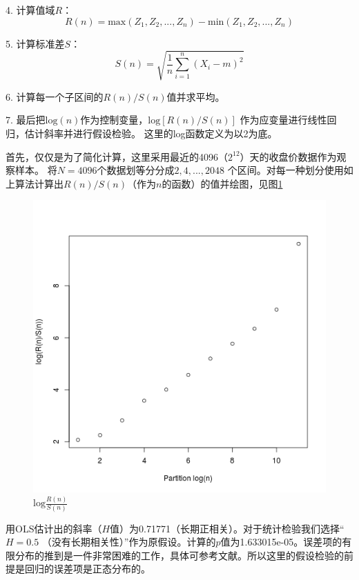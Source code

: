 \documentclass[11pt]{article}
\begin{document}
4. 计算值域$R$：
\begin{equation}
R(n) = \text{max}(Z_1,Z_2,...,Z_n)-\text{min}(Z_1,Z_2,...,Z_n)
\end{equation}

5. 计算标准差$S$：
\begin{equation}
S(n)=\sqrt{\frac{1}{n}\sum\limits_{i=1}^n(X_i-m)^2}
\end{equation}

6. 计算每一个子区间的$R(n)/S(n)$值并求平均。

7. 最后把$\text{log}(n)$作为控制变量，$\text{log}[ R(n)/S(n)]$ 作为应变量进行线性回归，估计斜率并进行假设检验。 这里的log函数定义为以2为底。

首先，仅仅是为了简化计算，这里采用最近的4096（$2^{12}$）天的收盘价数据作为观察样本。 将$N=4096$个数据划等分分成$2,4,...,2048$ 个区间。对每一种划分使用如上算法计算出$R(n)/S(n)$（作为$n$的函数）的值并绘图，见图\ref{logRS}
\begin{figure}[h]
	\centering
	\includegraphics[scale=0.4]{logRS.png}
	\caption{$\text{log}\frac{R(n)}{S(n)}$}
\label{logRS}
\end{figure}

用OLS估计出的斜率（$H$值）为0.71771（长期正相关）。对于统计检验我们选择“$H=0.5$ （没有长期相关性）”作为原假设。计算的$p$值为1.633015e-05。误差项的有限分布的推到是一件非常困难的工作，具体可参考文献。所以这里的假设检验的前提是回归的误差项是正态分布的。




\end{document}
